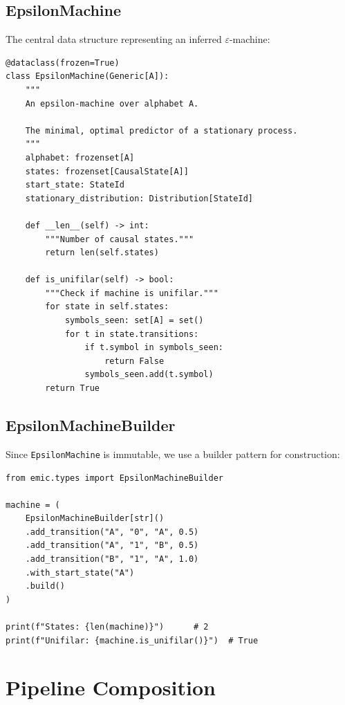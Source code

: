 \documentclass[11pt,a4paper]{report}
\theoremstyle{definition}
\theoremstyle{plain}
\newcommand{\eps}{\varepsilon}
\begin{document}
\subsection{EpsilonMachine}

The central data structure representing an inferred $\eps$-machine:

\begin{lstlisting}[caption={EpsilonMachine class (simplified)}]
@dataclass(frozen=True)
class EpsilonMachine(Generic[A]):
    """
    An epsilon-machine over alphabet A.

    The minimal, optimal predictor of a stationary process.
    """
    alphabet: frozenset[A]
    states: frozenset[CausalState[A]]
    start_state: StateId
    stationary_distribution: Distribution[StateId]

    def __len__(self) -> int:
        """Number of causal states."""
        return len(self.states)

    def is_unifilar(self) -> bool:
        """Check if machine is unifilar."""
        for state in self.states:
            symbols_seen: set[A] = set()
            for t in state.transitions:
                if t.symbol in symbols_seen:
                    return False
                symbols_seen.add(t.symbol)
        return True
\end{lstlisting}

\subsection{EpsilonMachineBuilder}

Since \texttt{EpsilonMachine} is immutable, we use a builder pattern for construction:

\begin{lstlisting}[caption={Builder pattern for machine construction}]
from emic.types import EpsilonMachineBuilder

machine = (
    EpsilonMachineBuilder[str]()
    .add_transition("A", "0", "A", 0.5)
    .add_transition("A", "1", "B", 0.5)
    .add_transition("B", "1", "A", 1.0)
    .with_start_state("A")
    .build()
)

print(f"States: {len(machine)}")      # 2
print(f"Unifilar: {machine.is_unifilar()}")  # True
\end{lstlisting}

\section{Pipeline Composition}
\end{document}
